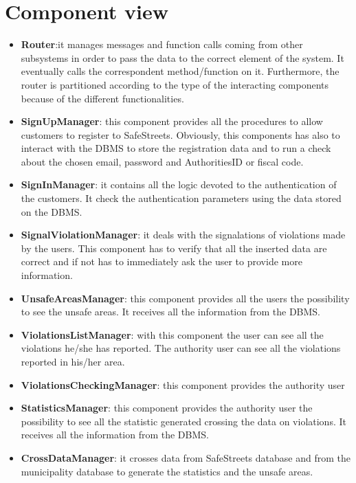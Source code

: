     \section{Component view}
    \begin{itemize}
        \item \textbf{Router}:it manages messages and function calls coming from
        other subsystems in order to pass the data to the correct element of the
        system. It eventually calls the correspondent method/function on it.
        Furthermore, the router is partitioned according to the type of the
        interacting components because of the different functionalities. 
        \item \textbf{SignUpManager}: this component provides all the procedures
        to allow customers to register to SafeStreets. Obviously, this
        components has also to interact with the DBMS to store the registration
        data and to run a check about the chosen email, password and
        AuthoritiesID or fiscal code.
        \item \textbf{SignInManager}: it contains all the logic devoted to the
        authentication of the customers. It check the authentication parameters
        using the data stored on the DBMS.
        \item \textbf{SignalViolationManager}: it deals with the signalations of
        violations made by the users. This component has to verify that all the
        inserted data are correct and if not has to immediately ask the user to
        provide more information.
        \item \textbf{UnsafeAreasManager}: this component provides all the users
        the possibility to see the unsafe areas. It receives all the information
        from the DBMS.
        \item \textbf{ViolationsListManager}: with this component the user can
        see all the violations he/she has reported. The authority user can see
        all the violations reported in his/her area.
        \item \textbf{ViolationsCheckingManager}: this component provides the authority user 
        \item \textbf{StatisticsManager}: this component provides the authority
        user the possibility to see all the statistic generated crossing the
        data on violations. It receives all the information from the DBMS.
        \item \textbf{CrossDataManager}: it crosses data from SafeStreets
        database and from the municipality database to generate the statistics
        and the unsafe areas.
    \end{itemize}    
